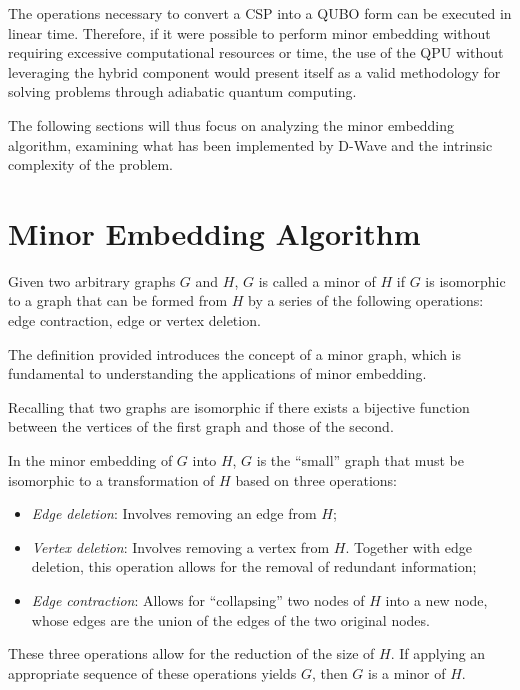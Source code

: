 The operations necessary to convert a CSP into a QUBO form can be executed in linear time. Therefore, if it were possible to perform minor embedding without requiring excessive computational resources or time, the use of the QPU without leveraging the hybrid component would present itself as a valid methodology for solving problems through adiabatic quantum computing.

The following sections will thus focus on analyzing the minor embedding algorithm, examining what has been implemented by D-Wave and the intrinsic complexity of the problem.

\section{Minor Embedding Algorithm}

\begin{displayquote}
    Given two arbitrary graphs $G$ and $H$, $G$ is called a minor of $H$ if $G$ is isomorphic to a graph that can be formed from $H$ by a series of the following operations: edge contraction, edge or vertex deletion.
\end{displayquote}

The definition provided introduces the concept of a minor graph, which is fundamental to understanding the applications of minor embedding. 

Recalling that two graphs are isomorphic if there exists a bijective function between the vertices of the first graph and those of the second.

In the minor embedding of $G$ into $H$, $G$ is the ``small'' graph that must be isomorphic to a transformation of $H$ based on three operations:
\begin{itemize}
    \item \emph{Edge deletion}: Involves removing an edge from $H$;
    \item \emph{Vertex deletion}: Involves removing a vertex from $H$. Together with edge deletion, this operation allows for the removal of redundant information;
    \item \emph{Edge contraction}: Allows for ``collapsing'' two nodes of $H$ into a new node, whose edges are the union of the edges of the two original nodes.
\end{itemize}

These three operations allow for the reduction of the size of $H$. If applying an appropriate sequence of these operations yields $G$, then $G$ is a minor of $H$.

